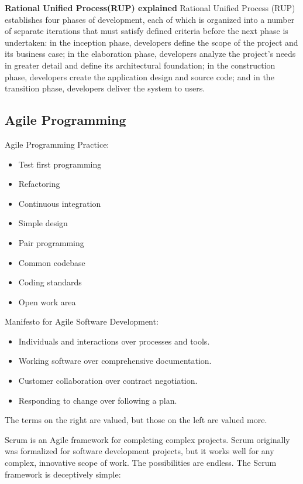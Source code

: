 \documentclass[a4paper]{article}
\begin{document}
\textbf{Rational Unified Process(RUP) explained \newline} 
Rational Unified Process (RUP) establishes four phases of development, each of which is organized into a number of separate iterations that must satisfy defined criteria before the next phase is undertaken: in the inception phase, developers define the scope of the project and its business case; in the elaboration phase, developers analyze the project's needs in greater detail and define its architectural foundation; in the construction phase, developers create the application design and source code; and in the transition phase, developers deliver the system to users. 


\subsection{Agile Programming}
Agile Programming Practice:
\begin{itemize}
\item Test first programming
\item Refactoring
\item Continuous integration
\item Simple design
\item Pair programming
\item Common codebase
\item Coding standards
\item Open work area
\end{itemize}

Manifesto for Agile Software Development:
\begin{itemize}
\item Individuals and interactions over processes and tools.
\item Working software over comprehensive documentation.
\item Customer collaboration over contract negotiation.
\item Responding to change over following a plan.
\end{itemize}

The terms on the right are valued, but those on the left are valued more.

Scrum is an Agile framework for completing complex projects. Scrum originally was formalized for software development projects, but it works well for any complex, innovative scope of work. The possibilities are endless. The Scrum framework is deceptively simple:
\end{document}
